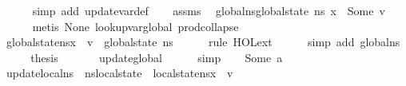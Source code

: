 \begin{isabellebody}
\ \ \ \ \isamarkupfalse%
\ {\isacharparenleft}{\kern0pt}simp\ add{\isacharcolon}{\kern0pt}\ update{\isacharunderscore}{\kern0pt}var{\isacharunderscore}{\kern0pt}def{\isacharparenright}{\kern0pt}\isanewline
\isanewline
\ \ \isamarkupfalse%
\ assms\ \isamarkupfalse%
\ global{\isacharunderscore}{\kern0pt}ns{\isacharcolon}{\kern0pt}{\isachardoublequoteopen}global{\isacharunderscore}{\kern0pt}state\ ns\ x\ {\isacharequal}{\kern0pt}\ Some\ v{\isachardoublequoteclose}\isanewline
\ \ \ \ \isamarkupfalse%
\ {\isacharparenleft}{\kern0pt}metis\ None\ lookup{\isacharunderscore}{\kern0pt}var{\isacharunderscore}{\kern0pt}global\ prod{\isachardot}{\kern0pt}collapse{\isacharparenright}{\kern0pt}\isanewline
\isanewline
\ \ \isamarkupfalse%
\ {\isachardoublequoteopen}{\isacharparenleft}{\kern0pt}global{\isacharunderscore}{\kern0pt}state{\isacharparenleft}{\kern0pt}ns{\isacharparenright}{\kern0pt}{\isacharparenright}{\kern0pt}{\isacharparenleft}{\kern0pt}x\ {\isasymmapsto}\ v{\isacharparenright}{\kern0pt}\ {\isacharequal}{\kern0pt}\ global{\isacharunderscore}{\kern0pt}state\ ns{\isachardoublequoteclose}\isanewline
\ \ \ \ \isamarkupfalse%
\ {\isacharparenleft}{\kern0pt}rule\ HOL{\isachardot}{\kern0pt}ext{\isacharparenright}{\kern0pt}\isanewline
\ \ \ \ \isamarkupfalse%
\ {\isacharparenleft}{\kern0pt}simp\ add{\isacharcolon}{\kern0pt}\ global{\isacharunderscore}{\kern0pt}ns{\isacharparenright}{\kern0pt}\isanewline
\ \ \isamarkupfalse%
\ \isamarkupfalse%
\ {\isacharquery}{\kern0pt}thesis\ \isanewline
\ \ \ \ \isamarkupfalse%
\ update{\isacharunderscore}{\kern0pt}global\isanewline
\ \ \ \ \isamarkupfalse%
\ simp\isanewline
{}\isamarkupfalse%
\isanewline
\ \ \isamarkupfalse%
\ {\isacharparenleft}{\kern0pt}Some\ a{\isacharparenright}{\kern0pt}\isanewline
\ \ \isamarkupfalse%
\ update{\isacharunderscore}{\kern0pt}local{\isacharcolon}{\kern0pt}{\isachardoublequoteopen}{\isacharquery}{\kern0pt}ns{\isacharprime}{\kern0pt}\ {\isacharequal}{\kern0pt}\ ns{\isasymlparr}local{\isacharunderscore}{\kern0pt}state\ {\isacharcolon}{\kern0pt}{\isacharequal}{\kern0pt}\ {\isacharparenleft}{\kern0pt}local{\isacharunderscore}{\kern0pt}state{\isacharparenleft}{\kern0pt}ns{\isacharparenright}{\kern0pt}{\isacharparenright}{\kern0pt}{\isacharparenleft}{\kern0pt}x\ {\isasymmapsto}\ v{\isacharparenright}{\kern0pt}{\isasymrparr}{\isachardoublequoteclose}\isanewline

\end{isabellebody}
